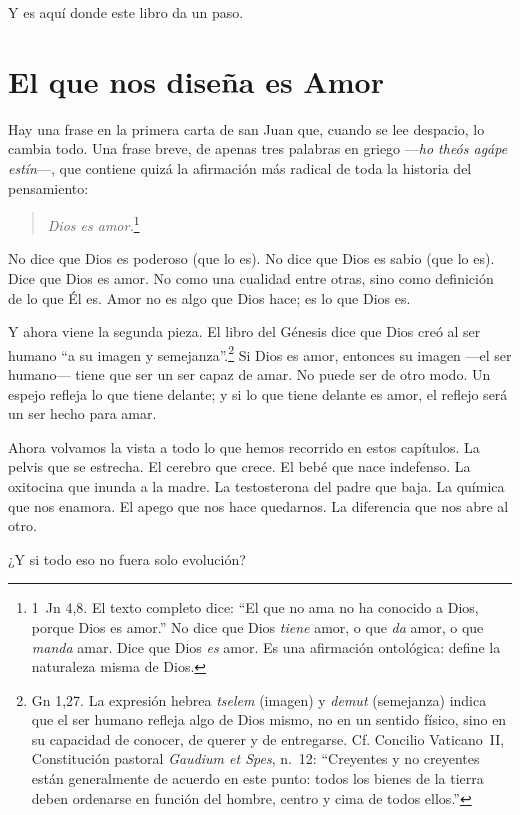 Y es aquí donde este libro da un paso.

\section{El que nos diseña es Amor}

Hay una frase en la primera carta de san Juan que, cuando se lee despacio, lo cambia todo. Una frase breve, de apenas tres palabras en griego ---\textit{ho theós agápe estín}---, que contiene quizá la afirmación más radical de toda la historia del pensamiento:

\begin{quotation}
\textit{Dios es amor.}\footnote{1~Jn 4,8. El texto completo dice: ``El que no ama no ha conocido a Dios, porque Dios es amor.'' No dice que Dios \textit{tiene} amor, o que \textit{da} amor, o que \textit{manda} amar. Dice que Dios \textit{es} amor. Es una afirmación ontológica: define la naturaleza misma de Dios.}
\end{quotation}

No dice que Dios es poderoso (que lo es). No dice que Dios es sabio (que lo es). Dice que Dios es amor. No como una cualidad entre otras, sino como definición de lo que Él es. Amor no es algo que Dios hace; es lo que Dios es.

Y ahora viene la segunda pieza. El libro del Génesis dice que Dios creó al ser humano ``a su imagen y semejanza''.\footnote{Gn 1,27. La expresión hebrea \textit{tselem} (imagen) y \textit{demut} (semejanza) indica que el ser humano refleja algo de Dios mismo, no en un sentido físico, sino en su capacidad de conocer, de querer y de entregarse. Cf. Concilio Vaticano~II, Constitución pastoral \textit{Gaudium et Spes}, n.~12: ``Creyentes y no creyentes están generalmente de acuerdo en este punto: todos los bienes de la tierra deben ordenarse en función del hombre, centro y cima de todos ellos.''} Si Dios es amor, entonces su imagen ---el ser humano--- tiene que ser un ser capaz de amar. No puede ser de otro modo. Un espejo refleja lo que tiene delante; y si lo que tiene delante es amor, el reflejo será un ser hecho para amar.

Ahora volvamos la vista a todo lo que hemos recorrido en estos capítulos. La pelvis que se estrecha. El cerebro que crece. El bebé que nace indefenso. La oxitocina que inunda a la madre. La testosterona del padre que baja. La química que nos enamora. El apego que nos hace quedarnos. La diferencia que nos abre al otro.

¿Y si todo eso no fuera solo evolución?

